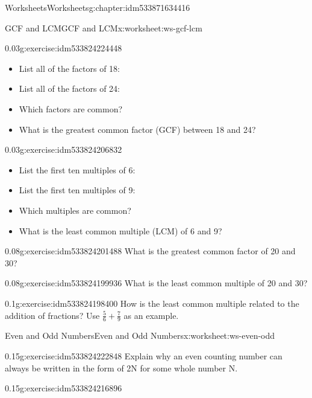\documentclass[twoside,11pt,]{book}
\begin{document}
\begin{chapterptx}{Worksheets}{}{Worksheets}{}{}{g:chapter:idm533871634416}
\begin{worksheet-section-numberless}{GCF and LCM}{}{GCF and LCM}{}{}{x:worksheet:ws-gcf-lcm}
\begin{divisionexercise}{1}{}{0.03}{g:exercise:idm533824224448}
\begin{itemize}[label=\textbullet]
\item{}List all of the factors of 18:%
\item{}List all of the factors of 24:%
\item{}Which factors are common?%
\item{}What is the greatest common factor (GCF) between 18 and 24?%
\end{itemize}
%
\end{divisionexercise}%
\begin{divisionexercise}{2}{}{0.03}{g:exercise:idm533824206832}%
%
\begin{itemize}[label=\textbullet]
\item{}List the first ten multiples of 6:%
\item{}List the first ten multiples of 9:%
\item{}Which multiples are common?%
\item{}What is the least common multiple (LCM) of 6 and 9?%
\end{itemize}
%
\end{divisionexercise}%
\begin{divisionexercise}{3}{}{0.08}{g:exercise:idm533824201488}%
What is the greatest common factor of 20 and 30?%
\end{divisionexercise}%
\begin{divisionexercise}{4}{}{0.08}{g:exercise:idm533824199936}%
What is the least common multiple of 20 and 30?%
\end{divisionexercise}%
\begin{divisionexercise}{5}{}{0.1}{g:exercise:idm533824198400}%
How is the least common multiple related to the addition of fractions?  Use   \(\frac{5}{6} + \frac{7}{9} \) as an example.%
\end{divisionexercise}%
\end{worksheet-section-numberless}
\restoregeometry
%
%
\typeout{************************************************}
\typeout{************************************************}
%
\begin{worksheet-section-numberless}{Even and Odd Numbers}{}{Even and Odd Numbers}{}{}{x:worksheet:ws-even-odd}
\begin{divisionexercise}{1}{}{0.15}{g:exercise:idm533824222848}%
Explain why an even counting number can always be written in the form of 2N for some whole number N.%
\end{divisionexercise}%
\begin{divisionexercise}{2}{}{0.15}{g:exercise:idm533824216896}%

\end{divisionexercise}
\end{worksheet-section-numberless}
\end{chapterptx}
\end{document}

